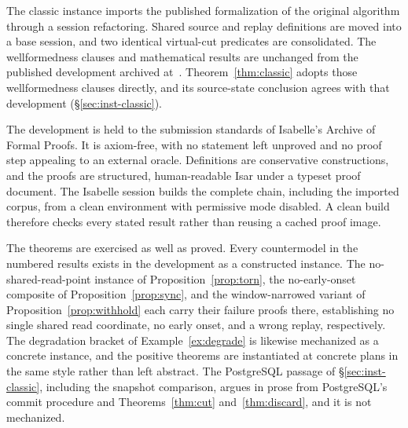 \documentclass[sigconf,nonacm,10pt]{acmart}
\theoremstyle{plain}
\theoremstyle{definition}
\begin{document}
The classic instance imports the published formalization of the original
algorithm through a session refactoring. Shared source and replay definitions
are moved into a base session, and two identical virtual-cut predicates
are consolidated. The wellformedness clauses and mathematical results
are unchanged from the published development
archived at~\cite{andreakis2026virtualcuts_artifact}.
Theorem~\ref{thm:classic} adopts those wellformedness clauses directly,
and its source-state conclusion agrees with that development
(\S\ref{sec:inst-classic}).

The development is held to the submission standards of Isabelle's
Archive of Formal Proofs. It is axiom-free, with no statement left
unproved and no proof step appealing to an external oracle.
Definitions are conservative constructions, and the proofs are
structured, human-readable Isar under a typeset proof document.
The Isabelle session builds the complete chain, including the
imported corpus, from a clean environment with permissive mode
disabled. A clean build therefore checks every stated result rather
than reusing a cached proof image.

The theorems are exercised as well as proved. Every countermodel in the
numbered results exists in the development as a constructed instance.
The no-shared-read-point instance of Proposition~\ref{prop:torn}, the
no-early-onset composite of Proposition~\ref{prop:sync}, and the
window-narrowed variant of Proposition~\ref{prop:withhold} each carry
their failure proofs there, establishing no single shared read coordinate, no early
onset, and a wrong replay, respectively. The degradation bracket of
Example~\ref{ex:degrade} is likewise mechanized as a concrete instance, 
and the positive theorems are instantiated at concrete plans in the same 
style rather than left abstract. The PostgreSQL passage of
\S\ref{sec:inst-classic}, including the snapshot comparison, argues in prose
from PostgreSQL's commit procedure and Theorems~\ref{thm:cut}
and~\ref{thm:discard}, and it is not mechanized.
\end{document}
